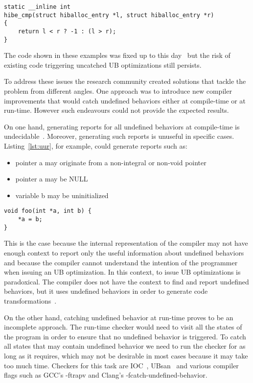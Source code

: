 \begin{lstlisting}[style=Cstyle, caption=Comparing pointers that do not
point to the same aggregate or union is undefined behavior so the
compiler is free to return anything from this function
(sys/kern/subr\_hibernate.c in the OpenBSD kernel), label={lst:ubo3}]
static __inline int
hibe_cmp(struct hiballoc_entry *l, struct hiballoc_entry *r)
{
	return l < r ? -1 : (l > r);
}
\end{lstlisting}

The code shown in these examples was fixed up to this
day~\cite{ubo1sol,ubo2sol,ubo3sol} but the risk of existing code
triggering uncatched UB optimizations still persists.

To address these issues the research community created solutions that
tackle the problem from different angles. One approach was to introduce
new compiler improvements that would catch undefined behaviors either at
compile-time or at run-time. However such endeavours could not provide
the expected results.

On one hand, generating reports for all undefined behaviors at
compile-time is undecidable~\cite{hathhorn2015defining}.  Moreover,
generating such reports is unuseful in specific cases.
Listing~\ref{lst:uur}, for example, could generate reports such as:
\begin{itemize} \item pointer a may originate from a non-integral or
non-void pointer \item pointer a may be NULL \item variable b may be
uninitialized \end{itemize}

\begin{lstlisting}[style=Cstyle, caption=Code that may report false
undefined behavior, label={lst:uur}]
void foo(int *a, int b) {
	*a = b;
}
\end{lstlisting}

This is the case because the internal representation of the compiler may
not have enough context to report only the useful information about
undefined behaviors and because the compiler cannot understand the
intention of the programmer when issuing an UB optimization. In this
context, to issue UB optimizations is paradoxical. The compiler does not
have the context to find and report undefined behaviors, but it uses
undefined behaviors in order to generate code
transformations~\cite{lee2017taming}.

On the other hand, catching undefined behavior at run-time proves to be
an incomplete approach. The run-time checker would need to visit all the
states of the program in order to ensure that no undefined behavior is
triggered. To catch all states that may contain undefined behavior we
need to run the checker for as long as it requires, which may not be
desirable in most cases because it may take too much time. Checkers for
this task are IOC~\cite{dietz2015understanding}, UBsan~\cite{ubsan} and
various compiler flags such as GCC's -ftrapv and Clang's
-fcatch-undefined-behavior.

